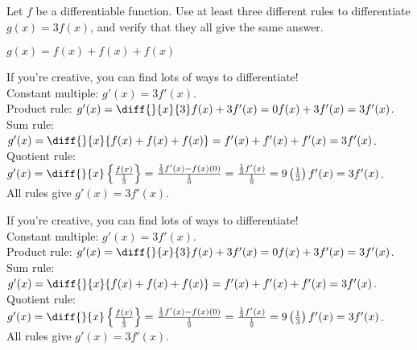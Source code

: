 \begin{question}Let $f$ be a differentiable function. Use at least three different rules to differentiate\\ $g(x)=3f(x)$, and verify that they all give the same answer.
\end{question}
\begin{hint} $g(x)=f(x)+f(x)+f(x)$
\end{hint}
\begin{answer} If you're creative, you can find lots of ways to differentiate!\\
Constant multiple: $g'(x)=3f'(x)$.\\
Product rule: $g'(x) = \diff{}{x}\{3\}f(x)+3f'(x)=0f(x)+3f'(x)=3f'(x)$.\\
Sum rule: $g'(x)=\diff{}{x}\{f(x)+f(x)+f(x)\}=f'(x)+f'(x)+f'(x)=3f'(x)$.\\
Quotient rule: $g'(x)=\diff{}{x}\left\{\frac{f(x)}{\frac{1}{3}}\right\}=
\frac{\frac{1}{3}f'(x)-f(x)(0)}{\frac{1}{9}}=\frac{\frac{1}{3}f'(x)}{\frac{1}{9}}=9\left(\frac{1}{3}\right)f'(x)=3f'(x)$.\\
All rules give $g'(x)=3f'(x)$.
\end{answer}
\begin{solution} If you're creative, you can find lots of ways to differentiate!\\
Constant multiple: $g'(x)=3f'(x)$.\\
Product rule: $g'(x) = \diff{}{x}\{3\}f(x)+3f'(x)=0f(x)+3f'(x)=3f'(x)$.\\
Sum rule: $g'(x)=\diff{}{x}\{f(x)+f(x)+f(x)\}=f'(x)+f'(x)+f'(x)=3f'(x)$.\\
Quotient rule: $g'(x)=\diff{}{x}\left\{\frac{f(x)}{\frac{1}{3}}\right\}=
\frac{\frac{1}{3}f'(x)-f(x)(0)}{\frac{1}{9}}=\frac{\frac{1}{3}f'(x)}{\frac{1}{9}}=9\left(\frac{1}{3}\right)f'(x)=3f'(x)$.\\
All rules give $g'(x)=3f'(x)$.
\end{solution}



\subsection*{\Procedural}

